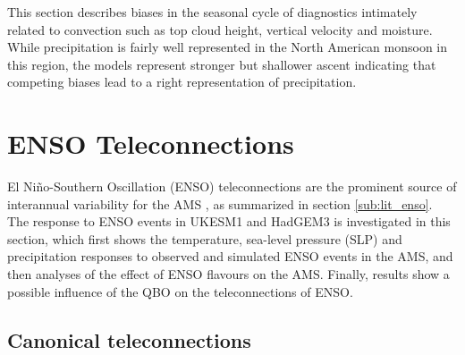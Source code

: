 This section describes biases in the seasonal cycle of diagnostics intimately related to convection such as top cloud height, vertical velocity and moisture. While precipitation is fairly well represented in the North American monsoon in this region, the models represent stronger but shallower ascent indicating that competing biases lead to a right representation of precipitation. 


\section{ENSO Teleconnections}\label{sq:enso1}

El Ni\~no-Southern Oscillation (ENSO) teleconnections are the prominent source of interannual variability for the AMS \citep{vera2006}, as summarized in section \ref{sub:lit_enso}.
The response to ENSO events in UKESM1 and HadGEM3 is investigated in this section, which first shows the temperature, sea-level pressure (SLP) and precipitation responses  to observed and simulated ENSO events in the AMS, and then analyses of the effect of ENSO flavours on the AMS. Finally, results show a possible influence of the QBO on the teleconnections of ENSO. 




\subsection{Canonical teleconnections}

